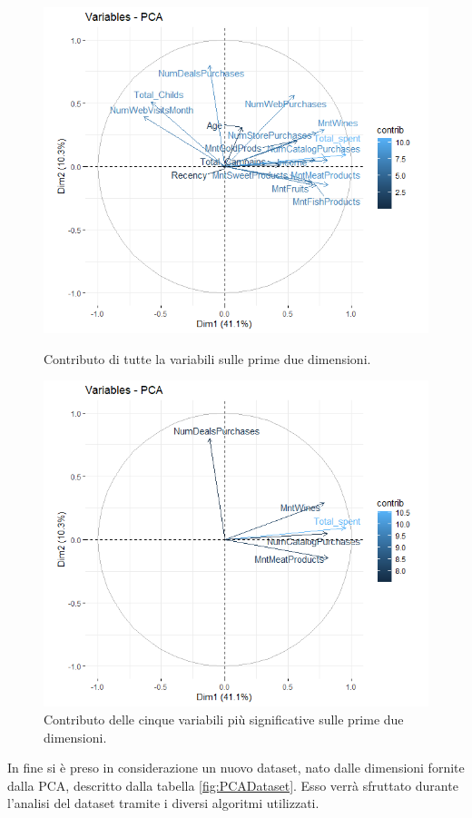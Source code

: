 \documentclass[letterpaper,11pt]{article}
\begin{document}
\begin{figure}[!htb]
   \begin{minipage}{0.48\textwidth}
     \centering
     \includegraphics[width=1\linewidth]{Img/PCA/Rplot03.png}
     \caption{Contributo di tutte la variabili sulle prime due dimensioni.}\label{fig:fvizpcavar1}
   \end{minipage}\hfill
   \begin{minipage}{0.48\textwidth}
     \centering
     \includegraphics[width=1\linewidth]{Img/PCA/Rplot04.png}
     \caption{Contributo delle cinque variabili più significative sulle prime due dimensioni.}\label{fig:fvizpcavar2}
   \end{minipage}
\end{figure}
In fine si è preso in considerazione un nuovo dataset, nato dalle dimensioni fornite dalla PCA, descritto dalla tabella \ref{fig:PCADataset}. Esso verrà sfruttato durante l'analisi del dataset tramite i diversi algoritmi utilizzati.
\end{document}
